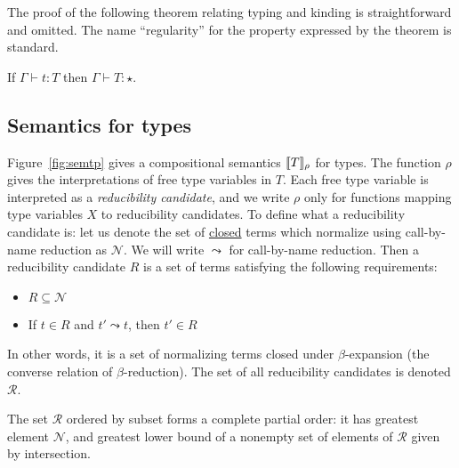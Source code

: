\documentclass{article}
\begin{document}
The proof of the following theorem relating typing and kinding is straightforward and omitted.
The name ``regularity'' for the property expressed by the theorem is standard.
\vspace{.25cm}
\begin{theorem}[Regularity]
\label{thm:regularity}
If $\Gamma \vdash t : T$ then $\Gamma \vdash T:\star$.
\end{theorem}


\subsection{Semantics for types}
\label{sec:sem}

Figure~\ref{fig:semtp} gives a compositional semantics
$\llbracket T \rrbracket_\rho$ for types.  The function $\rho$ gives the
interpretations of free type variables in $T$.  Each free type
variable is interpreted as a \emph{reducibility candidate}, and we write
$\rho$ only for functions mapping type variables $X$ to reducibility
candidates.  To define what a reducibility candidate is: let us denote
the set of \underline{closed} terms which normalize using call-by-name
reduction as $\mathcal{N}$.  We will write $\leadsto$ for call-by-name
reduction. Then a reducibility candidate $R$ is a set of terms
satisfying the following requirements:
\begin{itemize}
\item $R \subseteq \mathcal{N}$
\item If $t\in R$ and $t'\leadsto t$, then $t'\in R$
\end{itemize}
In other words, it is a set of normalizing terms closed under $\beta$-expansion (the converse relation
of $\beta$-reduction).  The set of all reducibility candidates is denoted $\mathcal{R}$.

\vspace{0.25cm}

\begin{lemma}
  The set $\mathcal{R}$ ordered by subset forms a complete partial
  order: it has greatest element $\mathcal{N}$, and greatest lower bound
  of a nonempty set of elements of $\mathcal{R}$ given by
  intersection.
\end{lemma}

\vspace{0.25cm}
\end{document}
